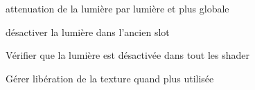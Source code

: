 
\begin{DoxyRefList}
\item[\label{todo__todo000001}%
\hypertarget{todo__todo000001}{}%
Class \hyperlink{class_light}{Light} ]attenuation de la lumière par lumière et plus globale  
\item[\label{todo__todo000003}%
\hypertarget{todo__todo000003}{}%
Member \hyperlink{class_light_a985e67a0b88ba49ec8da5d5b205d06ed}{Light\+:\+:set\+Number} (char num)]désactiver la lumière dans l'ancien slot  
\item[\label{todo__todo000002}%
\hypertarget{todo__todo000002}{}%
Member \hyperlink{class_light_ad0e59fad13bb6cfadc25b2c477e9ddc7}{Light\+:\+:$\sim$\+Light} ()]Vérifier que la lumière est désactivée dans tout les shader  
\item[\label{todo__todo000004}%
\hypertarget{todo__todo000004}{}%
Member \hyperlink{class_material_a2c19452d71f54075df8f5405b03129f4}{Material\+:\+:$\sim$\+Material} ()]Gérer libération de la texture quand plus utilisée 
\end{DoxyRefList}